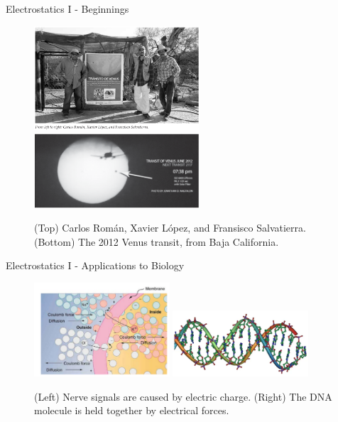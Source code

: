 \documentclass{beamer}
\begin{document}
\begin{frame}{Electrostatics I - Beginnings}
\small
\begin{figure}
\centering
\includegraphics[width=0.55\textwidth]{figures/roman_lopez_salvatierra.png}
\includegraphics[width=0.55\textwidth]{figures/venus.png}
\caption{\label{fig:franklin2} (Top) Carlos Rom\'{a}n, Xavier L\'{o}pez, and Fransisco Salvatierra. (Bottom) The 2012 Venus transit, from Baja California.}
\end{figure}
\end{frame}

\begin{frame}{Electrostatics I - Applications to Biology}
\begin{figure}
\centering
\includegraphics[width=0.45\textwidth]{figures/membrane.png}
\includegraphics[width=0.45\textwidth]{figures/dna.png}
\caption{\label{fig:membrane} (Left) Nerve signals are caused by electric charge. (Right) The DNA molecule is held together by electrical forces.}
\end{figure}
\end{frame}
\end{document}

